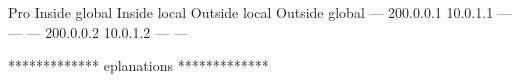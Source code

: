 Pro Inside global      Inside local       Outside local      Outside global
--- 200.0.0.1          10.0.1.1           ---                ---
--- 200.0.0.2          10.0.1.2           ---                ---

************* eplanations ************* 